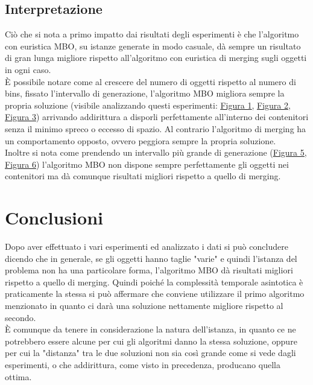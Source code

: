 \subsection{Interpretazione}
Ciò che si nota a primo impatto dai risultati degli esperimenti è che l'algoritmo con euristica MBO, su istanze generate in modo casuale, dà sempre un risultato
di gran lunga migliore rispetto all'algoritmo con euristica di merging sugli oggetti in ogni caso.\\
È possibile notare come al crescere del numero di oggetti rispetto al numero di bins, fissato l'intervallo di generazione, l'algoritmo MBO migliora sempre la 
propria soluzione (visibile analizzando questi esperimenti: \hyperref[sec:Exp1]{\underline{Figura 1}}, \hyperref[sec:Exp2]{\underline{Figura 2}}, 
\hyperref[sec:Exp3]{\underline{Figura 3}}) arrivando addirittura a disporli perfettamente all'interno dei contenitori senza il minimo spreco o eccesso di spazio. Al
contrario l'algoritmo di merging ha un comportamento opposto, ovvero peggiora sempre la propria soluzione.\\
Inoltre si nota come prendendo un intervallo più grande di generazione (\hyperref[sec:Exp5]{\underline{Figura 5}}, \hyperref[sec:Exp6]{\underline{Figura 6}}) 
l'algoritmo MBO non dispone sempre perfettamente gli oggetti nei contenitori ma dà comunque risultati migliori rispetto a quello di merging.


\section{Conclusioni}
Dopo aver effettuato i vari esperimenti ed analizzato i dati si può concludere dicendo che in generale, se gli oggetti hanno taglie "varie" e quindi l'istanza del problema
non ha una particolare forma, l'algoritmo MBO dà risultati migliori rispetto a quello di merging. Quindi poiché la complessità temporale asintotica è praticamente
la stessa si può affermare che conviene utilizzare il primo algoritmo menzionato in quanto ci darà una soluzione nettamente migliore rispetto al secondo.\\
È comunque da tenere in considerazione la natura dell'istanza, in quanto ce ne potrebbero essere alcune per cui gli algoritmi danno la stessa soluzione, oppure per cui la
"distanza" tra le due soluzioni non sia così grande come si vede dagli esperimenti, o che addirittura, come visto in precedenza, producano quella ottima.